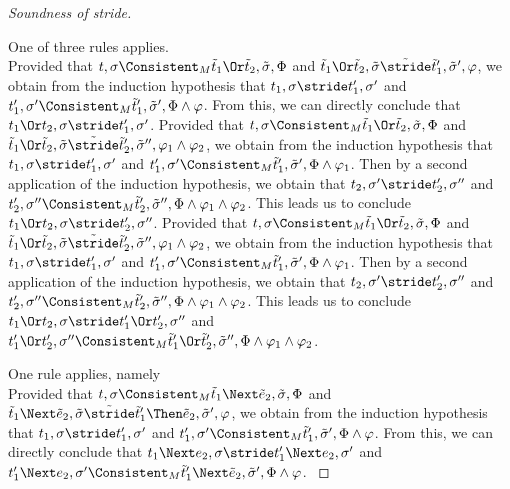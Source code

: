 \begin{proof}[Soundness of stride]
{{   }
 }

 {
One of three rules applies.\\
   {Provided that $t,\sigma\Consistent_M\tilde{t}_1\Or \tilde{t}_2,\tilde{\sigma},\Phi$
   and $\tilde{t}_1\Or \tilde{t}_2,\tilde{\sigma}\tilde{\stride}\tilde{t}'_1,\tilde{\sigma}',\phi$,
   we obtain from the induction hypothesis that $t_1,\sigma\stride t_1',\sigma'$ and $t_1',\sigma'\Consistent_M\tilde{t}_1',\tilde{\sigma}',\Phi\land\phi$.
   From this, we can directly conclude that $t_1\Or t_2,\sigma\stride t_1',\sigma'$.
  }
   { Provided that $t,\sigma\Consistent_M\tilde{t}_1\Or \tilde{t}_2,\tilde{\sigma},\Phi$
   and $\tilde{t}_1\Or \tilde{t}_2,\tilde{\sigma}\tilde{\stride}\tilde{t}'_2,\tilde{\sigma}'',\phi_1\land\phi_2$,
   we obtain from the induction hypothesis that $t_1,\sigma\stride t_1',\sigma'$ and $t_1',\sigma'\Consistent_M\tilde{t}_1',\tilde{\sigma}',\Phi\land\phi_1$.
   Then by a second application of the induction hypothesis, we obtain that $t_2,\sigma'\stride t_2',\sigma''$ and $t_2',\sigma''\Consistent_M\tilde{t}_2',\tilde{\sigma}'',\Phi\land\phi_1\land\phi_2$.
   This leads us to conclude $t_1\Or t_2,\sigma\stride t_2',\sigma''$.
   }
  {  Provided that $t,\sigma\Consistent_M\tilde{t}_1\Or \tilde{t}_2,\tilde{\sigma},\Phi$
  and $\tilde{t}_1\Or \tilde{t}_2,\tilde{\sigma}\tilde{\stride}\tilde{t}'_2,\tilde{\sigma}'',\phi_1\land\phi_2$,
  we obtain from the induction hypothesis that $t_1,\sigma\stride t_1',\sigma'$ and $t_1',\sigma'\Consistent_M\tilde{t}_1',\tilde{\sigma}',\Phi\land\phi_1$.
  Then by a second application of the induction hypothesis, we obtain that $t_2,\sigma'\stride t_2',\sigma''$ and $t_2',\sigma''\Consistent_M\tilde{t}_2',\tilde{\sigma}'',\Phi\land\phi_1\land\phi_2$.
  This leads us to conclude $t_1\Or t_2,\sigma\stride t_1'\Or t_2',\sigma''$ and $t_1'\Or t_2',\sigma''\Consistent_M\tilde{t}_1'\Or\tilde{t}_2',\tilde{\sigma}'',\Phi\land\phi_1\land\phi_2$.
   }
 }

 {One rule applies, namely \\
 Provided that $t,\sigma\Consistent_M\tilde{t}_1\Next \tilde{e}_2,\tilde{\sigma},\Phi$
 and $\tilde{t}_1\Next \tilde{e}_2,\tilde{\sigma}\tilde{\stride}\tilde{t}'_1\Then \tilde{e}_2,\tilde{\sigma}',\phi$,
 we obtain from the induction hypothesis that $t_1,\sigma\stride t_1',\sigma'$ and $t_1',\sigma'\Consistent_M\tilde{t}_1',\tilde{\sigma}',\Phi\land\phi$.
 From this, we can directly conclude that $t_1\Next e_2,\sigma\stride t_1'\Next e_2,\sigma'$ and $t_1'\Next e_2,\sigma'\Consistent_M\tilde{t}_1'\Next\tilde{e}_2,\tilde{\sigma}',\Phi\land\phi$.
}


\end{proof}
